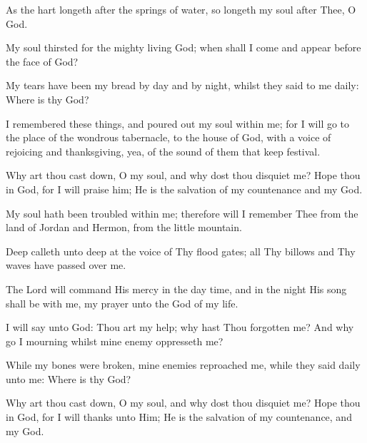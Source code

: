 As the hart longeth after the springs of water, so longeth my soul after Thee, O God.

My soul thirsted for the mighty living God; when shall I come and appear before the face of God?

My tears have been my bread by day and by night, whilst they said to me daily: Where is thy God?

I remembered these things, and poured out my soul within me; for I will go to the place of the wondrous tabernacle, to the house of God, with a voice of rejoicing and thanksgiving, yea, of the sound of them that keep festival.

Why art thou cast down, O my soul, and why dost thou disquiet me? Hope thou in God, for I will praise him; He is the salvation of my countenance and my God.

My soul hath been troubled within me; therefore will I remember Thee from the land of Jordan and Hermon, from the little mountain.

Deep calleth unto deep at the voice of Thy flood gates; all Thy billows and Thy waves have passed over me.

The Lord will command His mercy in the day time, and in the night His song shall be with me, my prayer unto the God of my life.

I will say unto God: Thou art my help; why hast Thou forgotten me? And why go I mourning whilst mine enemy oppresseth me?

While my bones were broken, mine enemies reproached me, while they said daily unto me: Where is thy God?

Why art thou cast down, O my soul, and why dost thou disquiet me? Hope thou in God, for I will thanks unto Him; He is the salvation of my countenance, and my God.
